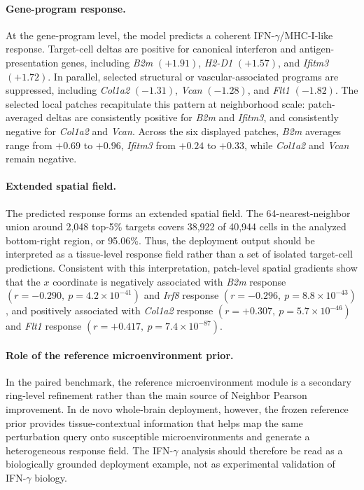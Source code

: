 \documentclass[sigconf,anonymous,review]{acmart}
\begin{document}
\paragraph{Gene-program response.}
At the gene-program level, the model predicts a coherent IFN-$\gamma$/MHC-I-like response. Target-cell deltas are positive for canonical interferon and antigen-presentation genes, including \textit{B2m} $(+1.91)$, \textit{H2-D1} $(+1.57)$, and \textit{Ifitm3} $(+1.72)$. In parallel, selected structural or vascular-associated programs are suppressed, including \textit{Col1a2} $(-1.31)$, \textit{Vcan} $(-1.28)$, and \textit{Flt1} $(-1.82)$. The selected local patches recapitulate this pattern at neighborhood scale: patch-averaged deltas are consistently positive for \textit{B2m} and \textit{Ifitm3}, and consistently negative for \textit{Col1a2} and \textit{Vcan}. Across the six displayed patches, \textit{B2m} averages range from $+0.69$ to $+0.96$, \textit{Ifitm3} from $+0.24$ to $+0.33$, while \textit{Col1a2} and \textit{Vcan} remain negative.

\paragraph{Extended spatial field.}
The predicted response forms an extended spatial field. The 64-nearest-neighbor union around 2,048 top-5\% targets covers 38,922 of 40,944 cells in the analyzed bottom-right region, or 95.06\%. Thus, the deployment output should be interpreted as a tissue-level response field rather than a set of isolated target-cell predictions. Consistent with this interpretation, patch-level spatial gradients show that the $x$ coordinate is negatively associated with \textit{B2m} response $(r=-0.290,\ p=4.2\times10^{-41})$ and \textit{Irf8} response $(r=-0.296,\ p=8.8\times10^{-43})$, and positively associated with \textit{Col1a2} response $(r=+0.307,\ p=5.7\times10^{-46})$ and \textit{Flt1} response $(r=+0.417,\ p=7.4\times10^{-87})$.

\paragraph{Role of the reference microenvironment prior.}
In the paired benchmark, the reference microenvironment module is a secondary ring-level refinement rather than the main source of Neighbor Pearson improvement. In de novo whole-brain deployment, however, the frozen reference prior provides tissue-contextual information that helps map the same perturbation query onto susceptible microenvironments and generate a heterogeneous response field. The IFN-$\gamma$ analysis should therefore be read as a biologically grounded deployment example, not as experimental validation of IFN-$\gamma$ biology.
\end{document}
